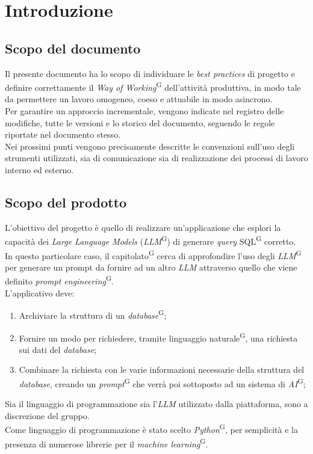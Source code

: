 \documentclass[5pt]{article}
\begin{document}
\pagebreak
\tableofcontents
\pagebreak

\section{Introduzione}

\subsection{Scopo del documento}
Il presente documento ha lo scopo di individuare le \textit{best practices} di progetto e definire correttamente il \textit{Way of Working}\textsuperscript{G} dell'attività produttiva, in modo tale da permettere un lavoro omogeneo, coeso e attuabile in modo asincrono. \\
Per garantire un approccio incrementale, vengono indicate nel registro delle modifiche, tutte le versioni e lo storico del documento, seguendo le regole riportate nel documento stesso. \\ 
Nei prossimi punti vengono precisamente descritte le convenzioni sull'uso degli strumenti utilizzati, sia di comunicazione sia di realizzazione dei processi di lavoro interno ed esterno.

\subsection{Scopo del prodotto}
L'obiettivo del progetto è quello di realizzare un'applicazione che esplori la capacità dei \textit{Large Language Models} (\textit{LLM}\textsuperscript{G}) di generare \textit{query} SQL\textsuperscript{G} corretto. \\
In questo particolare caso, il capitolato\textsuperscript{G} cerca di approfondire l'uso degli \textit{LLM}\textsuperscript{G} per generare un prompt da fornire ad un altro \textit{LLM} attraverso quello che viene definito \textit{prompt engineering}\textsuperscript{G}.\\
L'applicativo deve:
\begin{enumerate}
    \item Archiviare la struttura di un \textit{database}\textsuperscript{G};
    \item Fornire un modo per richiedere, tramite linguaggio naturale\textsuperscript{G}, una richiesta sui dati del \textit{database};
    \item Combinare la richiesta con le varie informazioni necessarie della struttura del \textit{database}, creando un 
    \textit{prompt}\textsuperscript{G} che verrà poi sottoposto ad un sistema di \textit{AI}\textsuperscript{G};
\end{enumerate}
Sia il linguaggio di programmazione sia l'\textit{LLM} utilizzato dalla piattaforma, sono a discrezione del gruppo. \\
Come linguaggio di programmazione è stato scelto \textit{Python}\textsuperscript{G}, per semplicità e la presenza di numerose librerie per il \textit{machine learning}\textsuperscript{G}.\\
\end{document}
